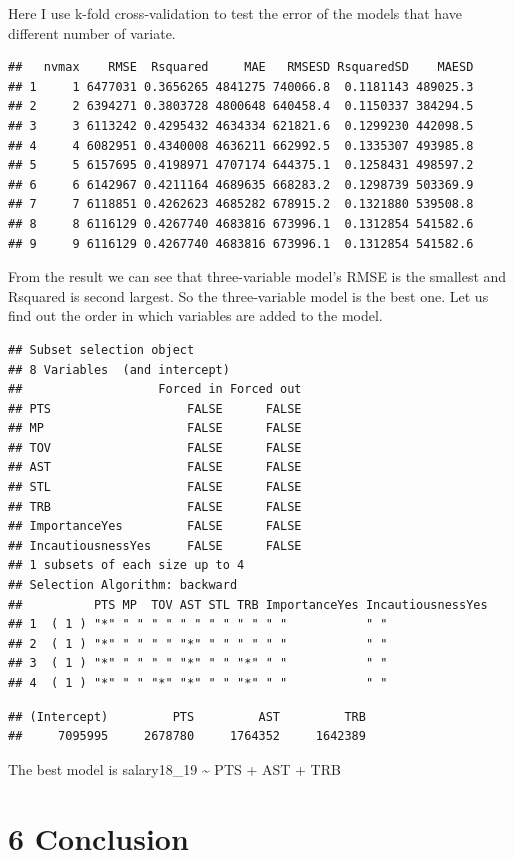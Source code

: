 \documentclass[]{article}
\begin{document}
Here I use k-fold cross-validation to test the error of the models that
have different number of variate.

\begin{verbatim}
##   nvmax    RMSE  Rsquared     MAE   RMSESD RsquaredSD    MAESD
## 1     1 6477031 0.3656265 4841275 740066.8  0.1181143 489025.3
## 2     2 6394271 0.3803728 4800648 640458.4  0.1150337 384294.5
## 3     3 6113242 0.4295432 4634334 621821.6  0.1299230 442098.5
## 4     4 6082951 0.4340008 4636211 662992.5  0.1335307 493985.8
## 5     5 6157695 0.4198971 4707174 644375.1  0.1258431 498597.2
## 6     6 6142967 0.4211164 4689635 668283.2  0.1298739 503369.9
## 7     7 6118851 0.4262623 4685282 678915.2  0.1321880 539508.8
## 8     8 6116129 0.4267740 4683816 673996.1  0.1312854 541582.6
## 9     9 6116129 0.4267740 4683816 673996.1  0.1312854 541582.6
\end{verbatim}

From the result we can see that three-variable model's RMSE is the
smallest and Rsquared is second largest. So the three-variable model is
the best one. Let us find out the order in which variables are added to
the model.

\begin{verbatim}
## Subset selection object
## 8 Variables  (and intercept)
##                   Forced in Forced out
## PTS                   FALSE      FALSE
## MP                    FALSE      FALSE
## TOV                   FALSE      FALSE
## AST                   FALSE      FALSE
## STL                   FALSE      FALSE
## TRB                   FALSE      FALSE
## ImportanceYes         FALSE      FALSE
## IncautiousnessYes     FALSE      FALSE
## 1 subsets of each size up to 4
## Selection Algorithm: backward
##          PTS MP  TOV AST STL TRB ImportanceYes IncautiousnessYes
## 1  ( 1 ) "*" " " " " " " " " " " " "           " "              
## 2  ( 1 ) "*" " " " " "*" " " " " " "           " "              
## 3  ( 1 ) "*" " " " " "*" " " "*" " "           " "              
## 4  ( 1 ) "*" " " "*" "*" " " "*" " "           " "
\end{verbatim}

\begin{verbatim}
## (Intercept)         PTS         AST         TRB 
##     7095995     2678780     1764352     1642389
\end{verbatim}

The best model is salary18\_19 \textasciitilde{} PTS + AST + TRB

\section{6 Conclusion}\label{conclusion}
\end{document}
